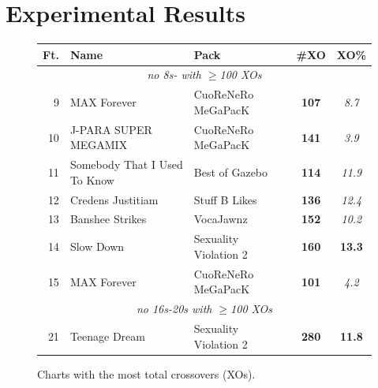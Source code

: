 \documentclass[10pt]{sigplanconf}
\begin{document}

\section{Experimental Results}



\begin{figure}[t]
	\begin{center}
		\small
	\begin{tabular}{r|l|l|c|c}
		\bf Ft. & \bf Name & \bf Pack & \bf \#XO & \bf XO\% \\
		\hline
		\multicolumn{5}{c}{\em no 8s- with $\ge$100 XOs} \\
		 9 & MAX Forever              & CuoReNeRo MeGaPacK    & \bf 107 & \em 8.7 \\
		10 & J-PARA SUPER MEGAMIX     & CuoReNeRo MeGaPacK    & \bf 141 & \em 3.9 \\
		11 & Somebody That I Used To Know & Best of Gazebo    & \bf 114 & \em 11.9 \\
		12 & Credens Justitiam        & Stuff B Likes         & \bf 136 & \em 12.4 \\
		13 & Banshee Strikes          & VocaJawnz             & \bf 152 & \em 10.2 \\
		14 & Slow Down                & Sexuality Violation 2 & \bf 160 & \bf 13.3 \\
		15 & MAX Forever              & CuoReNeRo MeGaPacK    & \bf 101 & \em 4.2 \\
		\multicolumn{5}{c}{\em no 16s-20s with $\ge$100 XOs} \\
		21 & Teenage Dream            & Sexuality Violation 2 & \bf 280 & \bf 11.8 \\
	\end{tabular}
	\end{center}
	\caption{Charts with the most total crossovers (XOs).}
\end{figure}
\end{document}
